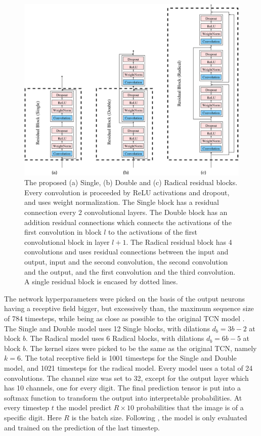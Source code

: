 \documentclass[a4paper, twoside]{article}
\begin{document}
\begin{figure}%
\begin{center}
    \includegraphics[width=16cm]{figGraph.eps}\caption{The proposed (a) Single, (b) Double and (c) Radical residual blocks. Every convolution is proceeded by ReLU activations and dropout, and uses weight normalization. The Single block has a residual connection every 2 convolutional layers. The Double block has an addition residual connections which connects the activations of the first convolution in block $l$ to the activations of the first convolutional block in layer $l+1$. The Radical residual block has 4 convolutions and uses residual connections between the input and output, input and the second convolution, the second convolution and the output, and the first convolution and the third convolution. A single residual block is encased by dotted lines.} \label{figTCNGraph}
\end{center}
\end{figure}

The network hyperparameters were picked on the basis of the output neurons having a receptive field bigger, but excessively than, the maximum sequence size of 784 timesteps, while being as close as possible to the original TCN model \cite{tcn}. The Single and Double model uses 12 Single blocks, with dilations $d_b=3b-2$ at block $b$. The Radical model uses 6 Radical blocks, with dilations $d_b=6b-5$ at block $b$. The kernel sizes were picked to be the same as the original TCN, namely $k=6$. The total receptive field is 1001 timesteps for the Single and Double model, and 1021 timesteps for the radical model. Every model uses a total of 24 convolutions. The channel size was set to 32, except for the output layer which has 10 channels, one for every digit. The final prediction tensor is put into a softmax function to transform the output into interpretable probabilities. At every timestep $t$ the model predict $R \times 10$ probabilities that the image is of a specific digit. Here $R$ is the batch size. Following \cite{tcn}, the model is only evaluated and trained on the prediction of the last timestep.
\end{document}
